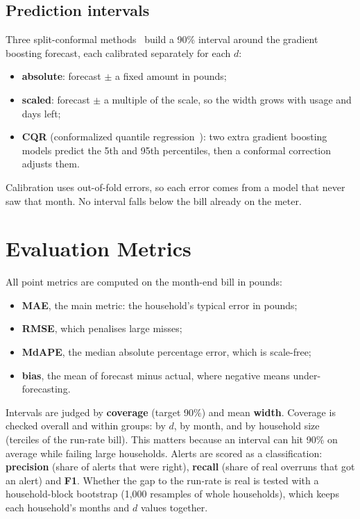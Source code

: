 \documentclass[11pt,letterpaper]{article}
\begin{document}
\subsection{Prediction intervals}
Three split-conformal methods~\cite{lei2018conformal} build a 90\% interval around the gradient boosting forecast,
each calibrated separately for each $d$:
\begin{itemize}
  \item \textbf{absolute}: forecast $\pm$ a fixed amount in pounds;
  \item \textbf{scaled}: forecast $\pm$ a multiple of the scale, so the width grows with usage and days left;
  \item \textbf{CQR} (conformalized quantile regression~\cite{romano2019cqr}): two extra gradient boosting models
  predict the 5th and 95th percentiles, then a conformal correction adjusts them.
\end{itemize}
Calibration uses out-of-fold errors, so each error comes from a model that never saw that month. No interval
falls below the bill already on the meter.

\section{Evaluation Metrics}
\label{sec:metrics}

All point metrics are computed on the month-end bill in pounds:
\begin{itemize}
  \item \textbf{MAE}, the main metric: the household's typical error in pounds;
  \item \textbf{RMSE}, which penalises large misses;
  \item \textbf{MdAPE}, the median absolute percentage error, which is scale-free;
  \item \textbf{bias}, the mean of forecast minus actual, where negative means under-forecasting.
\end{itemize}
Intervals are judged by \textbf{coverage} (target 90\%) and mean \textbf{width}. Coverage is checked overall and
within groups: by $d$, by month, and by household size (terciles of the run-rate bill). This matters because an
interval can hit 90\% on average while failing large households. Alerts are scored as a classification:
\textbf{precision} (share of alerts that were right), \textbf{recall} (share of real overruns that got an alert)
and \textbf{F1}. Whether the gap to the run-rate is real is tested with a household-block bootstrap (1,000
resamples of whole households), which keeps each household's months and $d$ values together.
\end{document}
